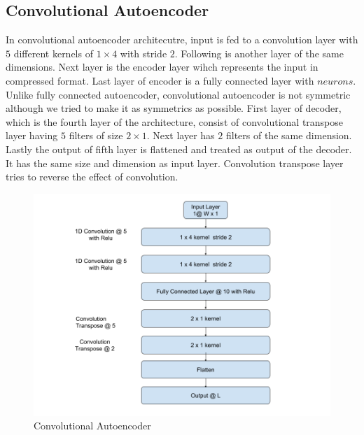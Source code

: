 \documentclass[12pt]{article}
\begin{document}
\subsection{Convolutional Autoencoder } 
In convolutional autoencoder architecutre, input is fed to a convolution layer with $5$ different kernels of $1 \times 4$ with stride $2$. Following is another layer of the same dimensions. Next layer is the encoder layer wihch represents the input in compressed format. Last layer of encoder is a fully connected layer with $neurons$. Unlike fully connected autoencoder, convolutional autoencoder is not symmetric although we tried to make it as symmetrics as possible. First layer of decoder, which is the fourth layer of the architecture, consist of convolutional transpose layer having $5$ filters of size $2 \times 1$. Next layer has $2$ filters of the same dimension. Lastly the output of fifth layer is flattened and treated as output of the decoder. It has the same size and dimension as input layer. Convolution transpose layer tries to reverse the effect of convolution. 
\begin{figure}[H]
\centering
        \includegraphics[width=\textwidth]{images/architecture/CnnAutoencoder.png}
    \caption{Convolutional Autoencoder}
    \label{cnnAutoencoder}
\end{figure}
\newpage
\end{document}
